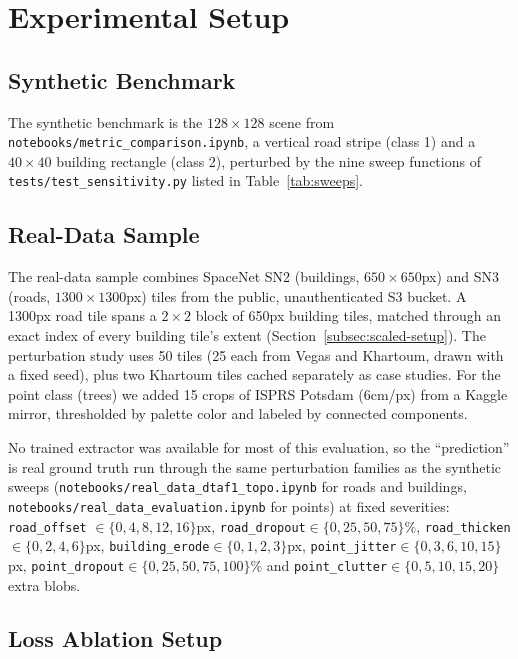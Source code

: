 \section{Experimental Setup}
\label{sec:expsetup}

\subsection{Synthetic Benchmark}
\label{subsec:synthetic-setup}

The synthetic benchmark is the $128\times128$ scene from \texttt{notebooks/metric\_comparison.ipynb},
a vertical road stripe (class 1) and a $40\times40$ building rectangle (class 2), perturbed by the
nine sweep functions of \texttt{tests/test\_sensitivity.py} listed in Table~\ref{tab:sweeps}.

\subsection{Real-Data Sample}
\label{subsec:realdata-setup}

The real-data sample combines SpaceNet SN2 (buildings, $650\times650$px) and SN3 (roads,
$1300\times1300$px) tiles from the public, unauthenticated S3 bucket. A 1300px road tile spans a
$2\times2$ block of 650px building tiles, matched through an exact index of every building tile's
extent (Section~\ref{subsec:scaled-setup}). The perturbation study uses 50 tiles (25 each from
Vegas and Khartoum, drawn with a fixed seed), plus two Khartoum tiles cached separately as case
studies. For the point class (trees) we added 15 crops of ISPRS Potsdam (6cm/px) \cite{isprs-potsdam} from a
Kaggle mirror, thresholded by palette color and labeled by connected components.

No trained extractor was available for most of this evaluation, so the ``prediction'' is real
ground truth run through the same perturbation families as the synthetic sweeps
(\texttt{notebooks/real\_data\_dtaf1\_topo.ipynb} for roads and buildings,
\texttt{notebooks/real\_data\_evaluation.ipynb} for points) at fixed severities: \texttt{road\_offset}
$\in\{0,4,8,12,16\}$px, \texttt{road\_dropout}$\in\{0,25,50,75\}\%$,
\texttt{road\_thicken}$\in\{0,2,4,6\}$px, \texttt{building\_erode}$\in\{0,1,2,3\}$px,
\texttt{point\_jitter}$\in\{0,3,6,10,15\}$px, \texttt{point\_dropout}$\in\{0,25,50,75,100\}\%$ and
\texttt{point\_clutter}$\in\{0,5,10,15,20\}$ extra blobs.

\subsection{Loss Ablation Setup}
\label{subsec:lossablation-setup}


